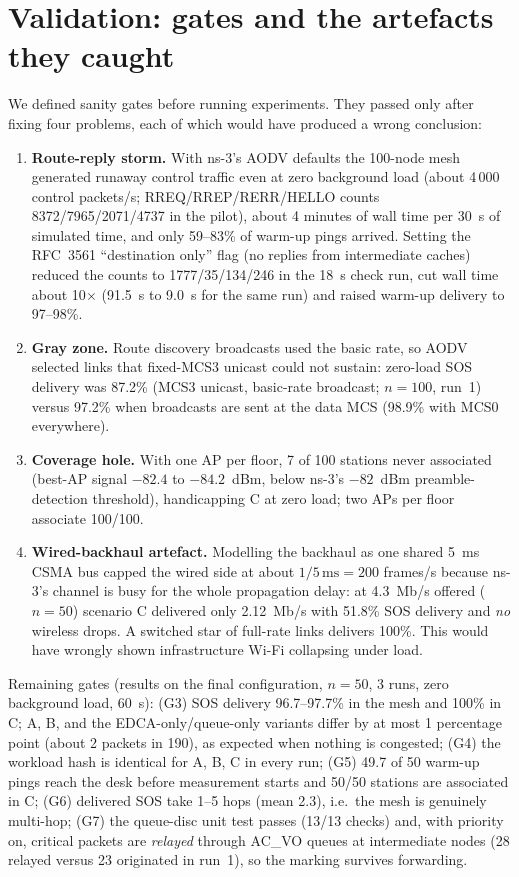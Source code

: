 \section{Validation: gates and the artefacts they caught}\label{sec:validation}
We defined sanity gates before running experiments. They passed only after fixing four problems, each of which would have produced a wrong conclusion:
\begin{enumerate}
\item \textbf{Route-reply storm.} With ns-3's AODV defaults the 100-node mesh generated runaway control traffic even at zero background load (about 4\,000 control packets/s; RREQ/RREP/RERR/HELLO counts 8372/7965/2071/4737 in the pilot), about 4 minutes of wall time per 30~s of simulated time, and only 59--83\% of warm-up pings arrived. Setting the RFC~3561 ``destination only'' flag (no replies from intermediate caches) reduced the counts to 1777/35/134/246 in the 18~s check run, cut wall time about 10$\times$ (91.5~s to 9.0~s for the same run) and raised warm-up delivery to 97--98\%.
\item \textbf{Gray zone.} Route discovery broadcasts used the basic rate, so AODV selected links that fixed-MCS3 unicast could not sustain:
zero-load SOS delivery was 87.2\% (MCS3 unicast, basic-rate broadcast; $n=100$, run~1) versus 97.2\% when broadcasts are sent at the data MCS (98.9\% with MCS0 everywhere).
\item \textbf{Coverage hole.} With one AP per floor, 7 of 100 stations never associated (best-AP signal $-82.4$ to $-84.2$~dBm, below ns-3's $-82$~dBm
preamble-detection threshold), handicapping C at zero load; two APs per floor associate 100/100.
\item \textbf{Wired-backhaul artefact.} Modelling the backhaul as one shared 5~ms CSMA bus capped the wired side at about $1/5\,\text{ms}=200$ frames/s because ns-3's channel is
busy for the whole propagation delay: at 4.3~Mb/s offered ($n=50$) scenario C delivered only 2.12~Mb/s with 51.8\% SOS delivery and \emph{no} wireless drops. A switched star
of full-rate links delivers 100\%. This would have wrongly shown infrastructure Wi-Fi collapsing under load.
\end{enumerate}
Remaining gates (results on the final configuration, $n=50$, 3 runs, zero background load, 60~s): (G3) SOS delivery 96.7--97.7\% in the mesh
and 100\% in C; A, B, and the EDCA-only/queue-only variants differ by at most 1 percentage point (about 2 packets in 190), as expected when nothing is congested;
(G4) the workload hash is identical for A, B, C in every run; (G5) 49.7 of 50 warm-up pings reach the desk before measurement starts and 50/50 stations are associated in C;
(G6) delivered SOS take 1--5 hops (mean 2.3), i.e.\ the mesh is genuinely multi-hop; (G7) the queue-disc unit test passes (13/13 checks) and, with priority on,
critical packets are \emph{relayed} through AC\_VO queues at intermediate nodes (28 relayed versus 23 originated in run~1), so the marking survives forwarding.
